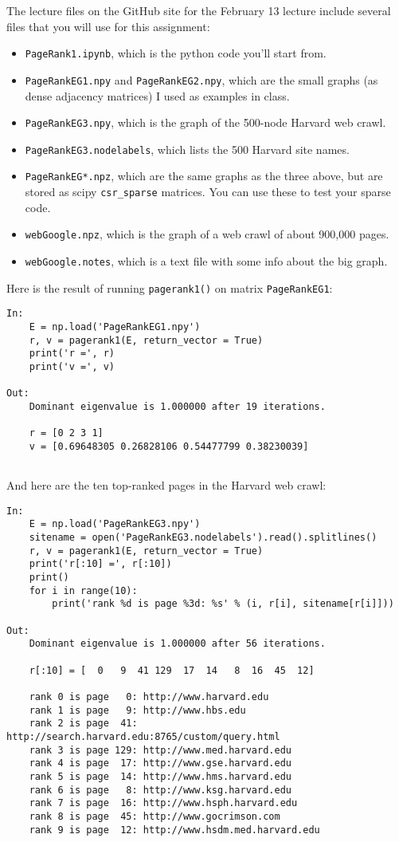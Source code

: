 \documentclass[11pt]{article}
\begin{document}
The lecture files on the GitHub site for the February 13 lecture  
include several files that you will use for this assignment:
\begin{itemize}
\item{\tt PageRank1.ipynb}, which is the python code you'll start from.
\item{\tt PageRankEG1.npy} and {\tt PageRankEG2.npy}, which are the small
   graphs (as dense adjacency matrices) I used as examples in class.
\item{\tt PageRankEG3.npy}, which is the graph of the 500-node Harvard web crawl.
\item{\tt PageRankEG3.nodelabels}, which lists the 500 Harvard site names.
\item{\tt PageRankEG*.npz}, which are the same graphs as the three above, but
   are stored as scipy {\tt csr\_sparse} matrices. You can use these to test
   your sparse code.
\item{\tt webGoogle.npz}, which is the graph of a web crawl of about 900,000 pages.
\item{\tt webGoogle.notes}, which is a text file with some info about the big graph.
\end{itemize}
Here is the result of running {\tt pagerank1()} on matrix {\tt PageRankEG1}:
\begin{verbatim}
In:
    E = np.load('PageRankEG1.npy')
    r, v = pagerank1(E, return_vector = True)
    print('r =', r)
    print('v =', v)

Out:
    Dominant eigenvalue is 1.000000 after 19 iterations.
    
    r = [0 2 3 1]
    v = [0.69648305 0.26828106 0.54477799 0.38230039]


\end{verbatim}
And here are the ten top-ranked pages in the Harvard web crawl:
\begin{verbatim}
In:
    E = np.load('PageRankEG3.npy')
    sitename = open('PageRankEG3.nodelabels').read().splitlines()
    r, v = pagerank1(E, return_vector = True)
    print('r[:10] =', r[:10])
    print()
    for i in range(10):
        print('rank %d is page %3d: %s' % (i, r[i], sitename[r[i]]))

Out:
    Dominant eigenvalue is 1.000000 after 56 iterations.
    
    r[:10] = [  0   9  41 129  17  14   8  16  45  12]
    
    rank 0 is page   0: http://www.harvard.edu
    rank 1 is page   9: http://www.hbs.edu
    rank 2 is page  41: http://search.harvard.edu:8765/custom/query.html
    rank 3 is page 129: http://www.med.harvard.edu
    rank 4 is page  17: http://www.gse.harvard.edu
    rank 5 is page  14: http://www.hms.harvard.edu
    rank 6 is page   8: http://www.ksg.harvard.edu
    rank 7 is page  16: http://www.hsph.harvard.edu
    rank 8 is page  45: http://www.gocrimson.com
    rank 9 is page  12: http://www.hsdm.med.harvard.edu
\end{verbatim}
\end{document}
